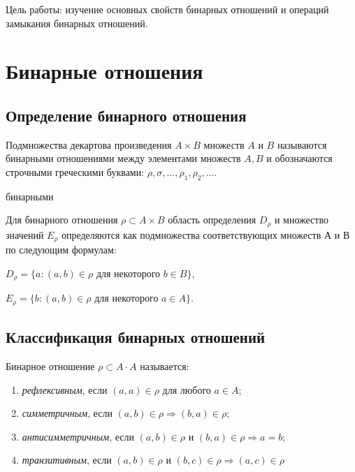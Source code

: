 \documentclass[bachelor, och, labwork]{shiza}
\begin{document}
	
	
	\tableofcontents
	
	\newpage
	
	Цель работы: изучение основных свойств бинарных отношений и операций замыкания бинарных отношений.
	
	\section{Бинарные отношения}
	    \subsection{Определение бинарного отношения}
	
	Подмножества декартова произведения $A \times B$ множеств $A$ и $B$ называются бинарными отношениями между элементами множеств $A, B$ и обозначаются строчными греческими буквами: 
	$\rho,\sigma, ..., \rho_1, \rho_2, ...   $.
	
	бинарными
	
	Для бинарного отношения $\rho \subset A \times B$ область определения $D_\rho$ и множество значений $E_\rho$ определяются как подмножества соответствующих множеств $А$ и $В$ по следующим формулам:
	
	 $D_\rho = \{a: (a,b) \in \rho $ для некоторого $ b \in B \}$,
	 
	 
	 $E_\rho = \{b: (a,b) \in \rho $ для некоторого $ a \in A \}$. 
	

    \subsection{Классификация бинарных отношений}

	Бинарное отношение $\rho \subset A \cdot A$ называется:

	\begin{enumerate}
		\item \textit{рефлексивным}, если $(a, a) \in \rho$ для любого $a \in A$;
		\item \textit{симметричным}, если $(a, b) \in \rho \Rightarrow (b, a) \in \rho$;
		\item \textit{антисимметричным}, если $(a, b) \in \rho \text{ и } (b, a) \in \rho \Rightarrow a = b$;
		\item \textit{транзитивным}, если $(a, b) \in \rho \text{ и } (b, c) \in \rho \Rightarrow (a, c) \in \rho$
	\end{enumerate}
	
\end{document}

